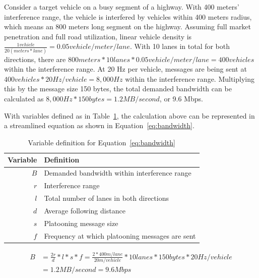 \documentclass[12pt]{report}
\begin{document}
Consider a target vehicle on a busy segment of a highway. With 400 meters' interference range, the vehicle is interfered by vehicles within 400 meters radius, which means an 800 meters long segment on the highway. Assuming full market penetration and full road utilization, linear vehicle density is $\frac{1 vehicle}{20 (meters*lane)}=0.05 vehicle/meter/lane$. With 10 lanes in total for both directions, there are $800 meters * 10 lanes * 0.05 vehicle/meter/lane = 400 vehicles$ within the interference range. At 20 Hz per vehicle, messages are being sent at $400 vehicles * 20 Hz/vehicle=8,000 Hz$ within the interference range. Multiplying this by the message size 150 bytes, the total demanded bandwidth can be calculated as $8,000 Hz * 150 bytes = 1.2 MB/second$, or 9.6 Mbps.

With variables defined as in Table~\ref{tab:bandwidth_equation_variable}, the calculation above can be represented in a streamlined equation as shown in Equation~\ref{eq:bandwidth}.

\begin{table}[h]
  \begin{center}
    \begin{tabular}{r l}
      \hline
      Variable & Definition \\ \hline
      $B$ & Demanded bandwidth within interference range \\
      $r$ & Interference range \\
      $l$ & Total number of lanes in both directions \\
      $d$ & Average following distance \\
      $s$ & Platooning message size \\
      $f$ & Frequency at which platooning messages are sent \\ \hline
    \end{tabular}
    \caption{\label{tab:bandwidth_equation_variable}Variable definition for Equation~\ref{eq:bandwidth}}
  \end{center}
\end{table}

\begin{equation}
  \begin{split}
    B & = \frac{2r}{d} * l * s * f = \frac{2 * 400m/lane}{20m/vehicle} * 10 lanes * 150 bytes * 20 Hz/vehicle \\
      & = 1.2 MB/second = 9.6 Mbps
  \end{split}
  \label{eq:bandwidth}
\end{equation}
\end{document}

